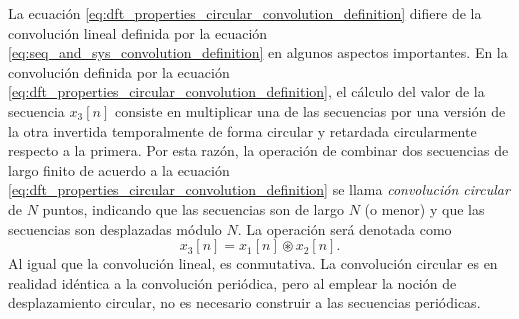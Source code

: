 \documentclass[a4paper]{report}
\begin{document}
La ecuación \ref{eq:dft_properties_circular_convolution_definition} difiere de la convolución lineal definida por la ecuación \ref{eq:seq_and_sys_convolution_definition} en algunos aspectos importantes. En la convolución definida por la ecuación \ref{eq:dft_properties_circular_convolution_definition}, el cálculo del valor de la secuencia \(x_3[n]\) consiste en multiplicar una de las secuencias por una versión de la otra invertida temporalmente de forma circular y retardada circularmente respecto a la primera. Por esta razón, la operación de combinar dos secuencias de largo finito de acuerdo a la ecuación \ref{eq:dft_properties_circular_convolution_definition} se llama \emph{convolución circular} de \(N\) puntos, indicando que las secuencias son de largo \(N\) (o menor) y que las secuencias son desplazadas módulo \(N\). La operación será denotada como
\[
 x_3[n]=x_1[n]\circledast x_2[n].
\]
Al igual que la convolución lineal, es conmutativa. La convolución circular es en realidad idéntica a la convolución periódica, pero al emplear la noción de desplazamiento circular, no es necesario construir a las secuencias periódicas.
\end{document}
